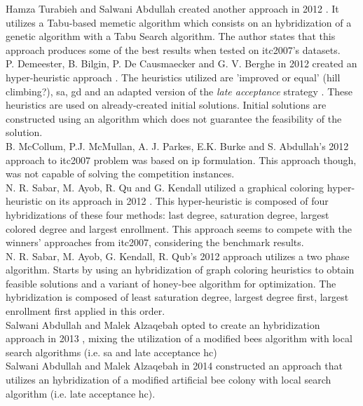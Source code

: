 Hamza Turabieh and Salwani Abdullah created another approach in 2012 \cite{Abdullah2012}. It utilizes a Tabu-based memetic algorithm which consists on an hybridization of a genetic algorithm with a Tabu Search algorithm. The author states that this approach produces some of the best results when tested on \gls{itc2007}'s datasets.\\

P. Demeester, B. Bilgin, P. De Causmaecker and G. V. Berghe in 2012 created an hyper-heuristic approach \cite{Demeester2012}. The heuristics utilized are 'improved or equal' {\color{red} (hill climbing?)}, \gls{sa}, \gls{gd} and an adapted version of the \textit{late acceptance} strategy \cite{Burke2008}. These heuristics are used on already-created initial solutions. Initial solutions are constructed using an algorithm which does not guarantee the feasibility of the solution.\\

B. McCollum, P.J. McMullan, A. J. Parkes, E.K. Burke and S. Abdullah's 2012 approach \cite{McCollum2012} to \gls{itc2007} problem was based on \gls{ip} formulation. This approach though, was not capable of solving the competition instances.\\

N. R. Sabar, M. Ayob, R. Qu and G. Kendall utilized a graphical coloring hyper-heuristic on its approach in 2012 \cite{Sabar2012}. This hyper-heuristic is composed of four hybridizations of these four methods: last degree, saturation degree, largest colored degree and largest enrollment. This approach seems to compete with the winners' approaches from \gls{itc2007}, considering the benchmark results.\\


N. R. Sabar, M. Ayob, G. Kendall, R. Qub's 2012 approach \cite{Sabar2012a} utilizes a two phase algorithm. Starts by using an hybridization of graph coloring heuristics to obtain feasible solutions and a variant of honey-bee algorithm for optimization. The hybridization is composed of least saturation degree, largest degree first, largest enrollment first applied in this order.\\

Salwani Abdullah and Malek Alzaqebah opted to create an hybridization approach in 2013 \cite{Abdullah2013}, mixing the utilization of a modified bees algorithm with local search algorithms (i.e. \gls{sa} and late acceptance \gls{hc})\\

Salwani Abdullah and Malek Alzaqebah in 2014 constructed an approach \cite{Alzaqebah2014} that utilizes an hybridization of a modified artificial bee colony with local search algorithm (i.e. late acceptance \gls{hc}).\\

